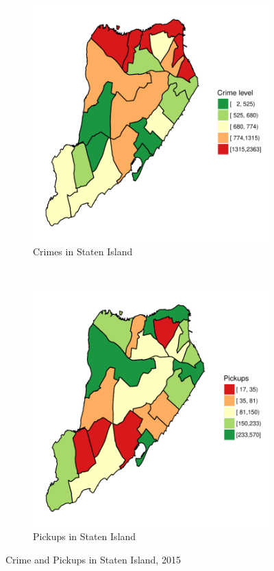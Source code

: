 \documentclass{sigkddExp}
\begin{document}
\begin{figure}
    \centering
    \begin{subfigure}[t]{0.5\textwidth}
        \centering
        \includegraphics[width=.9\textwidth]{../img/crimes_per_zone_2014_Staten_Island.pdf}
        \caption{Crimes in Staten Island}
        \label{fig:zones_shape}
    \end{subfigure}%
    ~ 
    \begin{subfigure}[t]{0.5\textwidth}
        \centering
        \includegraphics[width=.9\textwidth]{../img/taxis_2014_Staten_Island.pdf}
        \caption{Pickups in Staten Island}
        \label{fig:zones_raster}
    \end{subfigure}
    \caption{Crime and Pickups in Staten Island, 2015}
    \label{Staten Island}
\end{figure}
\end{document}
